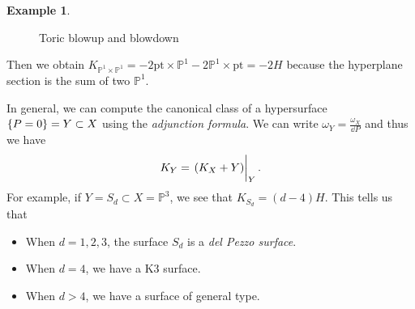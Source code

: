 \documentclass[leqno, openany]{memoir}
\theoremstyle{definition}
\newtheorem{exm}[thm]{Example}
\theoremstyle{remark}
\theoremstyle{plain}
\theoremstyle{definition}
\theoremstyle{remark}
\renewcommand{\P}{\mathbb{P}}
\newcommand{\mr}[1]{\mathrm{#1}}
\begin{document}
\begin{exm}
\begin{figure}[H]
        \caption{Toric blowup and blowdown}%
        \label{fig:Toric}
    \end{figure}
    Then we obtain $K_{\P^1 \times \P^1} = -2 \mr{pt} \times \P^1 - 2 \P^1 \times \mr{pt} = -2H$ because the hyperplane section is the sum of two $\P^1$. 
\end{exm}

In general, we can compute the canonical class of a hypersurface $\qty{P=0} = Y \subset X$ using the \textit{adjunction formula}. We can write $\omega_Y = \frac{\omega_X}{\dd{P}}$ and thus we have
\[ K_Y = \eval{(K_X + Y)}_{Y}. \]
For example, if $Y = S_d \subset X = \P^3$, we see that $K_{S_d} = (d-4)H$. This tells us that
\begin{itemize}
    \item When $d = 1,2,3$, the surface $S_d$ is a \textit{del Pezzo surface}. 
    \item When $d=4$, we have a K3 surface.
    \item When $d > 4$, we have a surface of general type.
\end{itemize}
\end{document}
